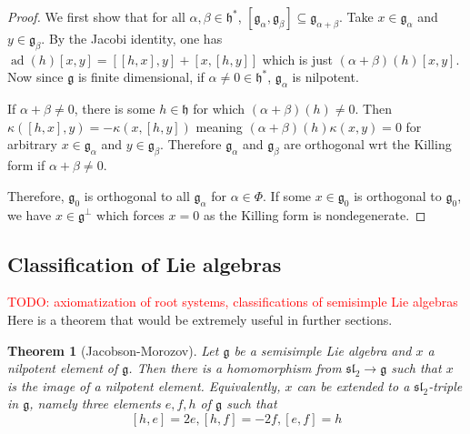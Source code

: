 \documentclass[12pt]{report}
\newtheorem{theorem}{Theorem}[section]
\theoremstyle{remark}
\theoremstyle{definition}
\newcommand{\kp}[0]{\kappa}
\newcommand{\ad}{\operatorname{ad}}
\begin{document}
    \begin{proof}
        We first show that for all $\alpha,\beta\in \mathfrak h^*$, $[\mathfrak g_\alpha, \mathfrak g_\beta]\subseteq \mathfrak g_{\alpha+\beta}$. Take $x\in\mathfrak g_\alpha$ and $y\in \mathfrak g_\beta$. By the Jacobi identity, one has $\ad(h)[x, y]=[[h, x], y]+[x, [h, y]]$ which is just $(\alpha+\beta)(h)[x, y]$. Now since $\mathfrak g$ is finite dimensional, if $\alpha\neq 0\in\mathfrak h^*$, $\mathfrak g_\alpha$ is nilpotent. 
        
        If $\alpha +\beta\neq 0$, there is some $h\in\mathfrak h$ for which $(\alpha+\beta)(h)\neq 0$. Then $\kp([h, x], y)=-\kp(x, [h, y])$ meaning $(\alpha+\beta)(h)\kappa(x, y)=0$ for arbitrary $x\in\mathfrak g_\alpha$ and $y\in \mathfrak g_\beta$. Therefore $\mathfrak g_\alpha$ and $\mathfrak g_\beta$ are orthogonal wrt the Killing form if $\alpha+\beta\neq 0$.

        Therefore, $\mathfrak g_0$ is orthogonal to all $\mathfrak g_\alpha$ for $\alpha\in\Phi$. If some $x\in \mathfrak g_0$ is orthogonal to $\mathfrak g_0$, we have $x\in \mathfrak g^\perp$ which forces $x=0$ as the Killing form is nondegenerate.
    \end{proof}
    \subsection{Classification of Lie algebras}
    \textcolor{red}{TODO: axiomatization of root systems, classifications of semisimple Lie algebras}
    Here is a theorem that would be extremely useful in further sections.
    \begin{theorem}[Jacobson-Morozov]\label{thm-jm}
        Let $\mathfrak g$ be a semisimple Lie algebra and $x$ a nilpotent element of $\mathfrak g$. Then there is a homomorphism from $\mathfrak{sl}_2\to\mathfrak g$ such that $x$ is the image of a nilpotent element. Equivalently, $x$ can be extended to a $\mathfrak{sl}_2$-triple in $\mathfrak g$, namely three elements ${e, f, h}$ of $\mathfrak g$ such that
        \[[h, e]=2e, [h, f]=-2f, [e, f]=h\]
    \end{theorem}
\end{document}
